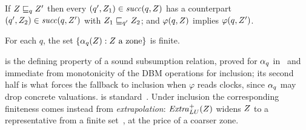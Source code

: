 \begin{lemma}[Simulation]\label{lem:sim}
If $Z \sqsubseteq_q Z'$ then every $(q',Z_1) \in \mathit{succ}(q,Z)$ has a
counterpart $(q',Z_2) \in \mathit{succ}(q,Z')$ with $Z_1 \sqsubseteq_{q'}
Z_2$; and $\varphi(q,Z)$ implies $\varphi(q,Z')$.
\end{lemma}

\begin{lemma}\label{lem:finite}
For each $q$, the set $\{\alpha_q(Z) : Z \text{ a zone}\}$ is finite.
\end{lemma}

 is the defining property of a sound subsumption relation, proved
for $\alpha_q$ in~\cite{Behrmann06,Herbreteau12} and immediate from monotonicity of
the DBM operations for inclusion; its second half is what forces the fallback to
inclusion when $\varphi$ reads clocks, since $\alpha_q$ may drop concrete
valuations.   is standard~\cite{Behrmann06}.  Under inclusion
the corresponding finiteness comes instead from \emph{extrapolation}:
$\mathit{Extra}^{+}_{LU}(Z)$ widens $Z$ to a representative from a finite
set~\cite{Daws98,Behrmann06}, at the price of a coarser zone.
